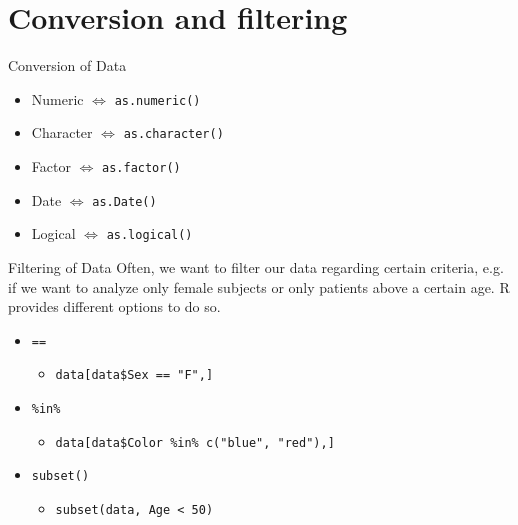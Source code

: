 \documentclass[xcolor=dvipsnames, aspectratio = 169]{beamer}
\begin{document}
\section{Conversion and filtering}
\begin{frame}[fragile]{Conversion of Data}
	\begin{itemize}
		\item Numeric $\Leftrightarrow$ \verb+as.numeric()+
		\item Character $\Leftrightarrow$ \verb+as.character()+
		\item Factor $\Leftrightarrow$ \verb+as.factor()+
		\item Date $\Leftrightarrow$ \verb+as.Date()+
		\item Logical $\Leftrightarrow$ \verb+as.logical()+
	\end{itemize}
\end{frame}



\begin{frame}[fragile]{Filtering of Data}
Often, we want to filter our data regarding certain criteria, e.g. if we want to analyze only female subjects or only patients above a certain age. R provides different options to do so.
	\begin{itemize}
		\item  \verb+==+
		\begin{itemize}
			\item  \verb+data[data$Sex == "F",]+
		\end{itemize}
		\item  \verb+%in%+
		\begin{itemize}
			\item  \verb+data[data$Color %in% c("blue", "red"),]+
		\end{itemize}
		\item  \verb+subset()+
		\begin{itemize}
			\item  \verb+subset(data, Age < 50)+
		\end{itemize}
	\end{itemize}
\end{frame}
\end{document}
